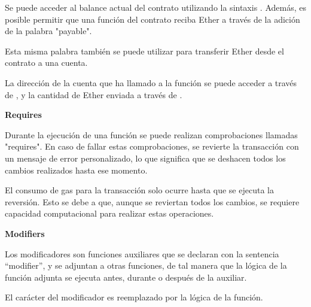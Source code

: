Se puede acceder al balance actual del contrato utilizando la sintaxis . Además, es posible permitir que una función del contrato reciba Ether a través de la adición de la palabra "payable".

\bigskip

Esta misma palabra también se puede utilizar para transferir Ether desde el contrato a una cuenta.

\bigskip

La dirección de la cuenta que ha llamado a la función se puede acceder a través de , y la cantidad de Ether enviada a través de .



\newpage

\bigskip

\textbf{Requires}

\bigskip

Durante la ejecución de una función se puede realizan comprobaciones llamadas "requires". En caso de fallar estas comprobaciones, se revierte la transacción con un mensaje de error personalizado, lo que significa que se deshacen todos los cambios realizados hasta ese momento.

\bigskip

El consumo de gas para la transacción solo ocurre hasta que se ejecuta la reversión. Esto se debe a que, aunque se reviertan todos los cambios, se requiere capacidad computacional para realizar estas operaciones.

\bigskip



\newpage

\textbf{Modifiers}

\bigskip

Los modificadores son funciones auxiliares que se declaran con la sentencia “modifier”, y se adjuntan a otras funciones, de tal manera que la lógica de la función adjunta se ejecuta antes, durante o después de la auxiliar.

\bigskip

El carácter \quotes{\_} del modificador es reemplazado por la lógica de la función.

\bigskip



